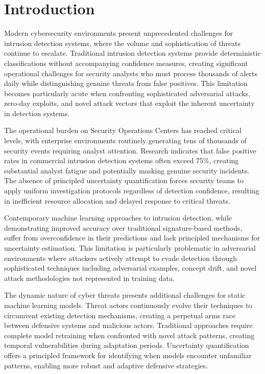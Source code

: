 \documentclass[journal]{IEEEtran}
\begin{document}
\section{Introduction}

Modern cybersecurity environments present unprecedented challenges for intrusion detection systems, where the volume and sophistication of threats continue to escalate. Traditional intrusion detection systems provide deterministic classifications without accompanying confidence measures, creating significant operational challenges for security analysts who must process thousands of alerts daily while distinguishing genuine threats from false positives. This limitation becomes particularly acute when confronting sophisticated adversarial attacks, zero-day exploits, and novel attack vectors that exploit the inherent uncertainty in detection systems.

The operational burden on Security Operations Centers has reached critical levels, with enterprise environments routinely generating tens of thousands of security events requiring analyst attention. Research indicates that false positive rates in commercial intrusion detection systems often exceed 75\%, creating substantial analyst fatigue and potentially masking genuine security incidents. The absence of principled uncertainty quantification forces security teams to apply uniform investigation protocols regardless of detection confidence, resulting in inefficient resource allocation and delayed response to critical threats.

Contemporary machine learning approaches to intrusion detection, while demonstrating improved accuracy over traditional signature-based methods, suffer from overconfidence in their predictions and lack principled mechanisms for uncertainty estimation. This limitation is particularly problematic in adversarial environments where attackers actively attempt to evade detection through sophisticated techniques including adversarial examples, concept drift, and novel attack methodologies not represented in training data.

The dynamic nature of cyber threats presents additional challenges for static machine learning models. Threat actors continuously evolve their techniques to circumvent existing detection mechanisms, creating a perpetual arms race between defensive systems and malicious actors. Traditional approaches require complete model retraining when confronted with novel attack patterns, creating temporal vulnerabilities during adaptation periods. Uncertainty quantification offers a principled framework for identifying when models encounter unfamiliar patterns, enabling more robust and adaptive defensive strategies.
\end{document}
